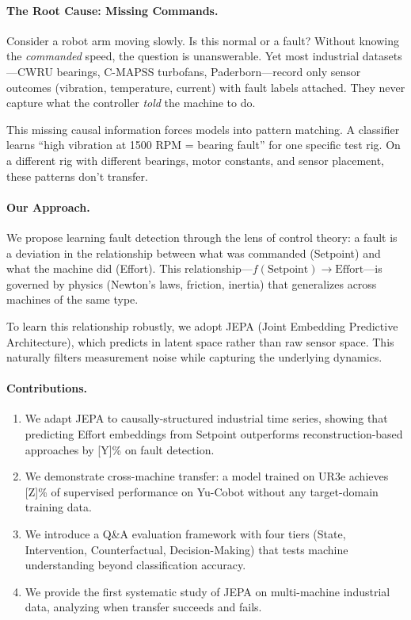 \documentclass{article}
\begin{document}
\paragraph{The Root Cause: Missing Commands.} Consider a robot arm moving slowly. Is this normal or a fault? Without knowing the \emph{commanded} speed, the question is unanswerable. Yet most industrial datasets—CWRU bearings, C-MAPSS turbofans, Paderborn—record only sensor outcomes (vibration, temperature, current) with fault labels attached. They never capture what the controller \emph{told} the machine to do.

This missing causal information forces models into pattern matching. A classifier learns ``high vibration at 1500 RPM = bearing fault'' for one specific test rig. On a different rig with different bearings, motor constants, and sensor placement, these patterns don't transfer.

\paragraph{Our Approach.} We propose learning fault detection through the lens of control theory: a fault is a deviation in the relationship between what was commanded (Setpoint) and what the machine did (Effort). This relationship—$f(\text{Setpoint}) \rightarrow \text{Effort}$—is governed by physics (Newton's laws, friction, inertia) that generalizes across machines of the same type.

To learn this relationship robustly, we adopt JEPA (Joint Embedding Predictive Architecture), which predicts in latent space rather than raw sensor space. This naturally filters measurement noise while capturing the underlying dynamics.

\paragraph{Contributions.}
\begin{enumerate}
    \item We adapt JEPA to causally-structured industrial time series, showing that predicting Effort embeddings from Setpoint outperforms reconstruction-based approaches by [Y]\% on fault detection.

    \item We demonstrate cross-machine transfer: a model trained on UR3e achieves [Z]\% of supervised performance on Yu-Cobot without any target-domain training data.

    \item We introduce a Q\&A evaluation framework with four tiers (State, Intervention, Counterfactual, Decision-Making) that tests machine understanding beyond classification accuracy.

    \item We provide the first systematic study of JEPA on multi-machine industrial data, analyzing when transfer succeeds and fails.
\end{enumerate}
\end{document}

